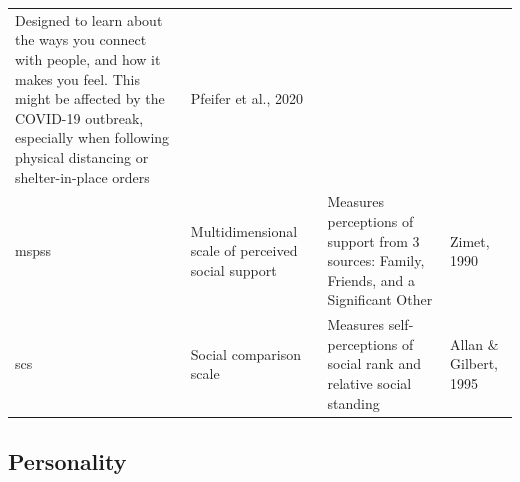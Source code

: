 \documentclass[]{book}
\begin{document}
\begin{longtable}[]{@{}llll@{}}
\begin{minipage}[t]{0.22\columnwidth}
Designed to learn about the ways you connect with people, and how it makes you feel. This might be affected by the COVID-19 outbreak, especially when following physical distancing or shelter-in-place orders\strut
\end{minipage} & \begin{minipage}[t]{0.18\columnwidth}\raggedright
Pfeifer et al., 2020\strut
\end{minipage}\tabularnewline
\begin{minipage}[t]{0.22\columnwidth}\raggedright
mspss\strut
\end{minipage} & \begin{minipage}[t]{0.27\columnwidth}\raggedright
Multidimensional scale of perceived social support\strut
\end{minipage} & \begin{minipage}[t]{0.22\columnwidth}\raggedright
Measures perceptions of support from 3 sources: Family, Friends, and a Significant Other\strut
\end{minipage} & \begin{minipage}[t]{0.18\columnwidth}\raggedright
Zimet, 1990\strut
\end{minipage}\tabularnewline
\begin{minipage}[t]{0.22\columnwidth}\raggedright
scs\strut
\end{minipage} & \begin{minipage}[t]{0.27\columnwidth}\raggedright
Social comparison scale\strut
\end{minipage} & \begin{minipage}[t]{0.22\columnwidth}\raggedright
Measures self-perceptions of social rank and relative social standing\strut
\end{minipage} & \begin{minipage}[t]{0.18\columnwidth}\raggedright
Allan \& Gilbert, 1995\strut
\end{minipage}\tabularnewline
\bottomrule
\end{longtable}

\hypertarget{personality}{%
\subsection{Personality}\label{personality}}
\end{document}
